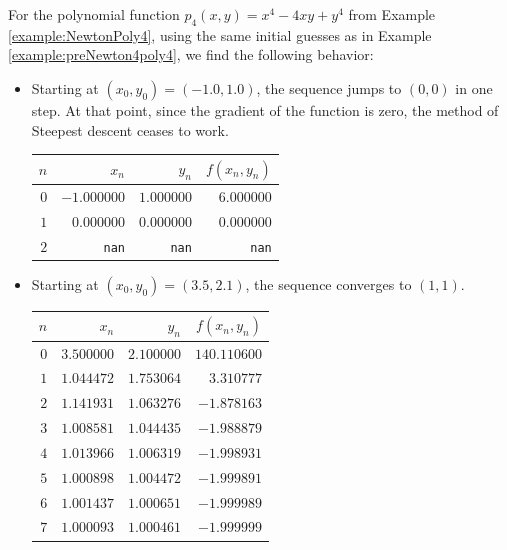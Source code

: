 \begin{example}
For the polynomial function $p_4(x,y) = x^4-4xy+y^4$ from Example \ref{example:NewtonPoly4}, using the same initial guesses as in Example \ref{example:preNewton4poly4}, we find the following behavior:
\begin{itemize}
	\item Starting at $(x_0, y_0) = (-1.0,1.0)$, the sequence jumps to $(0,0)$ in one step.  At that point, since the gradient of the function is zero, the method of Steepest descent ceases to work.
	\begin{center}
	\begin{tabular}{|r|r|r|r|} \hline 
	$n$ & $x_n$ & $y_n$ & $f(x_n,y_n)$ \\ \hline \hline 
	$0$ & $-1.000000$ & $1.000000$ & $6.000000$ \\ \hline 
	$1$ & $0.000000$ & $0.000000$ & $0.000000$ \\ \hline 
	$2$ & \texttt{nan} & \texttt{nan} & \texttt{nan} \\ \hline 
	\end{tabular}
	\end{center}
	\item Starting at $(x_0,y_0) = (3.5, 2.1)$, the sequence converges to $(1,1)$.
	\begin{center}
	\begin{tabular}{|r|r|r|r|} \hline 
	$n$ & $x_n$ & $y_n$ & $f(x_n,y_n)$ \\ \hline \hline 
	$0$ & $3.500000$ & $2.100000$ & $140.110600$ \\ \hline 
	$1$ & $1.044472$ & $1.753064$ & $3.310777$ \\ \hline 
	$2$ & $1.141931$ & $1.063276$ & $-1.878163$ \\ \hline 
	$3$ & $1.008581$ & $1.044435$ & $-1.988879$ \\ \hline 
	$4$ & $1.013966$ & $1.006319$ & $-1.998931$ \\ \hline 
	$5$ & $1.000898$ & $1.004472$ & $-1.999891$ \\ \hline 
	$6$ & $1.001437$ & $1.000651$ & $-1.999989$ \\ \hline 
	$7$ & $1.000093$ & $1.000461$ & $-1.999999$ \\ \hline 
	\end{tabular}~\begin{tabular}{|r|r|r|r|} \hline 

\end{tabular}
\end{center}
\end{itemize}
\end{example}
